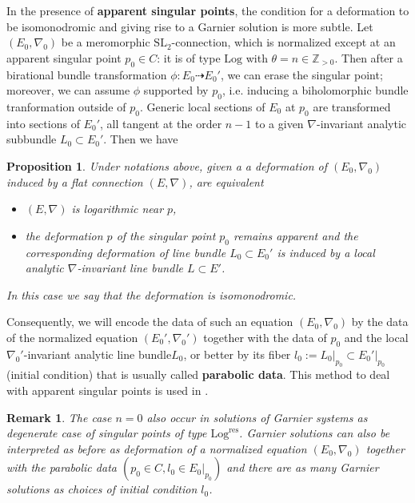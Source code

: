 \documentclass[12]{amsart}
\newtheorem{prop}[thm]{Proposition}
\newtheorem{remark}[thm]{Remark}
\newcommand{\SL}{\mathrm{SL}_2}
\newcommand{\Log}{\boldsymbol{\mathrm{Log}}}
\newcommand{\Logres}{\boldsymbol{\mathrm{Log}^{\mathrm{res}}}}
\begin{document}
In the presence of {\bf apparent singular points}, the condition for a deformation to be isomonodromic
and giving rise to a Garnier solution is more subtle. 
Let $(E_0,\nabla_0)$ be a meromorphic $\SL$-connection, which is normalized except
at an apparent singular point $p_0\in C$: it is of type $\Log$ 
with $\theta=n\in\mathbb Z_{>0}$. Then after a birational bundle transformation $\phi:E_0\dashrightarrow E_0'$,
we can erase the singular point; moreover, we can assume $\phi$ supported by $p_0$, i.e. inducing a biholomorphic 
bundle tranformation outside of $p_0$. Generic local sections of $E_0$ at $p_0$ are transformed into sections of $E_0'$,
all tangent at the order $n-1$ to a given $\nabla$-invariant analytic subbundle $L_0\subset E_0'$. Then we have


\begin{prop}\label{prop:singappIsom}Under notations above, given a a deformation of $(E_0,\nabla_0)$ 
induced by a flat connection $(E,\nabla)$, are equivalent
\begin{itemize}
\item $(E,\nabla)$ is logarithmic near $p$,
\item the deformation $p$ of the singular point $p_0$ remains apparent 
and the corresponding deformation of line bundle $L_0\subset E_0'$ is induced by a local analytic $\nabla$-invariant 
line bundle $L\subset E'$.
\end{itemize}
In this case we say that the deformation is isomonodromic.
\end{prop}

Consequently, we will encode the data of such an equation $(E_0,\nabla_0)$ by the data of 
the normalized equation $(E_0',\nabla_0')$ together with the data of $p_0$ and the local 
$\nabla_0'$-invariant analytic line bundle$L_0$, or better by its fiber $l_0:=L_0\vert_{p_0}\subset E_0'\vert_{p_0}$
(initial condition) that is usually called {\bf parabolic data}. This method to deal with 
apparent singular points is used in \cite{IIS}.

\begin{remark}
The case $n=0$ also occur in solutions of Garnier systems as degenerate case
of singular points of type $\Logres$.
Garnier solutions can also be interpreted as before as deformation of a normalized equation $(E_0,\nabla_0)$
together with the parabolic data $(p_0\in C,l_0\in E_0\vert_{p_0})$ and there are as many Garnier solutions
as choices of initial condition $l_0$. 
\end{remark}
\end{document}
